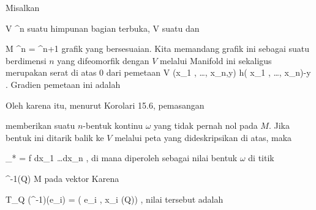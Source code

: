 {

Misalkan

\mavergleichskette
{\vergleichskette
{ V
}
{ \subseteq }{ \R^n
}
{  }{
}
{    }{
}
{   }{
}
}
{}{}{}
suatu himpunan bagian terbuka,
 { V } {\R
} {}
suatu
dan

\mavergleichskette
{\vergleichskette
{M
}
{ \subset }{ \R^n \times \R
}
{ = }{\R^{n+1}
}
{    }{
}
{   }{
}
}
{}{}{}
grafik yang bersesuaian. Kita memandang grafik ini sebagai suatu
berdimensi $n$ yang difeomorfik dengan $V$ melalui
Manifold ini sekaligus merupakan serat di atas $0$ dari pemetaan
\maabbeledisp {\varphi} {V \times \R} {\R
} {(x_1 , \ldots , x_n,y)} { h( x_1 , \ldots , x_n)-y
} {.}
Gradien pemetaan ini adalah

 {  }

Oleh karena itu, menurut
Korolari 15.6,
pemasangan

 {  }

memberikan suatu $n$-bentuk kontinu $\omega$ yang tidak pernah nol pada $M$. Jika bentuk ini ditarik balik ke $V$ melalui peta
 {} {}
yang dideskripsikan di atas, maka

\mavergleichskette
{\vergleichskette
{ \alpha_*\omega
}
{ = }{ f dx_1 \wedge \ldots \wedge dx_n
}
{  }{
}
{    }{
}
{   }{
}
}
{}{}{,}
di mana
 diperoleh sebagai nilai bentuk $\omega$ di titik

\mavergleichskette
{\vergleichskette
{ \alpha^{-1}(Q)
}
{ \in }{ M
}
{  }{
}
{    }{
}
{   }{
}
}
{}{}{}
pada vektor
Karena

\mavergleichskette
{\vergleichskette
{ T_Q (\alpha^{-1})(e_i)
}
{ = }{ ( e_i ,  { \partial x_i } (Q))
}
{  }{
}
{    }{
}
{   }{
}
}
{}{}{,}
nilai tersebut adalah

}
